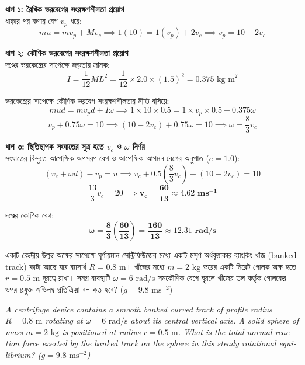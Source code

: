 \documentclass[12pt, a4paper]{article}
\begin{document}
\begin{tcolorbox}[solutionbox={সমাধান (Solution)}]
\noindent
\textbf{ধাপ ১: রৈখিক ভরবেগের সংরক্ষণশীলতা প্রয়োগ} \\
ধাক্কার পর কণার বেগ $v_p$ ধরে:
\[m u = m v_p + M v_c \implies 1(10) = 1(v_p) + 2 v_c \implies v_p = 10 - 2 v_c\]

\vspace{0.5em}
\noindent\textbf{ধাপ ২: কৌণিক ভরবেগের সংরক্ষণশীলতা প্রয়োগ} \\
দণ্ডের ভরকেন্দ্রের সাপেক্ষে জড়তার ভ্রামক:
\[I = \frac{1}{12} M L^2 = \frac{1}{12} \times 2.0 \times (1.5)^2 = 0.375\text{ kg m}^2\]

ভরকেন্দ্রের সাপেক্ষে কৌণিক ভরবেগ সংরক্ষণশীলতার নীতি বসিয়ে:
\[m u d = m v_p d + I \omega \implies 1 \times 10 \times 0.5 = 1 \times v_p \times 0.5 + 0.375 \omega\]
\[v_p + 0.75 \omega = 10 \implies (10 - 2 v_c) + 0.75 \omega = 10 \implies \omega = \frac{8}{3} v_c\]

\vspace{0.5em}
\noindent\textbf{ধাপ ৩: স্থিতিস্থাপক সংঘাতের সূত্র হতে $v_c$ ও $\omega$ নির্ণয়} \\
সংঘাতের বিন্দুতে আপেক্ষিক অপসরণ বেগ ও আপেক্ষিক আগমন বেগের অনুপাত ($e = 1.0$):
\[(v_c + \omega d) - v_p = u \implies v_c + 0.5\left(\frac{8}{3} v_c\right) - (10 - 2 v_c) = 10\]
\[\frac{13}{3} v_c = 20 \implies \mathbf{v_c = \frac{60}{13} \approx 4.62\text{ ms}^{-1}}\]

দণ্ডের কৌণিক বেগ:
\[\mathbf{\omega = \frac{8}{3} \left(\frac{60}{13}\right) = \frac{160}{13} \approx 12.31\text{ rad/s}}\]
\end{tcolorbox}
\begin{tcolorbox}[questionbox={প্রশ্ন (Question) 43}]
    \noindent
    একটি কেন্দ্রীয় উল্লম্ব অক্ষের সাপেক্ষে ঘূর্ণায়মান সেন্ট্রিফিউজের মধ্যে একটি মসৃণ অর্ধবৃত্তাকার ব্যাংকিং খাঁজ (banked track) কাটা আছে যার ব্যাসার্ধ $R = 0.8\text{ m}$। খাঁজের মধ্যে $m = 2\text{ kg}$ ভরের একটি নিরেট গোলক অক্ষ হতে $r = 0.5\text{ m}$ দূরত্বে রাখা। সমগ্র ব্যবস্থাটি $\omega = 6\text{ rad/s}$ সমকৌণিক বেগে ঘুরলে খাঁজের তল কর্তৃক গোলকের ওপর প্রযুক্ত অভিলম্ব প্রতিক্রিয়া বল কত হবে? ($g = 9.8\text{ ms}^{-2}$)
    
    \vspace{0.8em}
    \begin{english}
    \noindent\textit{\color{darkgray}
    A centrifuge device contains a smooth banked curved track of profile radius $R = 0.8\text{ m}$ rotating at $\omega = 6\text{ rad/s}$ about its central vertical axis. A solid sphere of mass $m = 2\text{ kg}$ is positioned at radius $r = 0.5\text{ m}$. What is the total normal reaction force exerted by the banked track on the sphere in this steady rotational equilibrium? ($g = 9.8\text{ ms}^{-2}$)
    }
    \end{english}
\end{tcolorbox}
\end{document}
